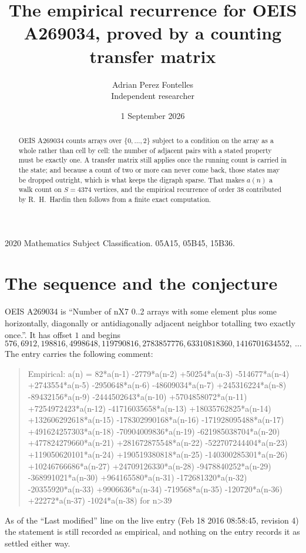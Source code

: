 \documentclass[11pt,a4paper]{article}
\title{The empirical recurrence for OEIS A269034, proved by a counting transfer matrix}
\author{Adrian Perez Fontelles\\ \small Independent researcher}
\date{1 September 2026}
\theoremstyle{plain}
\theoremstyle{definition}
\begin{document}
\maketitle

\begin{abstract}
OEIS A269034 counts arrays over $\{0,\dots,2\}$ subject to a condition on the array as a
whole rather than cell by cell: the number of adjacent pairs with a stated property must be
exactly one. A transfer matrix still applies once the running count is carried in the state; and
because a count of two or more can never come back, those states may be dropped outright,
which is what keeps the digraph sparse. That makes $a(n)$ a walk count on $S=4374$ vertices,
and the empirical recurrence of order $38$ contributed by R.~H.~Hardin then follows from
a finite exact computation.
\end{abstract}

\noindent\small 2020 Mathematics Subject Classification. 05A15, 05B45, 15B36.\normalsize

\section{The sequence and the conjecture}

OEIS A269034 is ``Number of nX7 0..2 arrays with some element plus some horizontally, diagonally or antidiagonally adjacent neighbor totalling two exactly once.''. It has offset $1$ and begins
\[
576, 6912, 198816, 4998648, 119790816, 2783857776, 63310818360, 1416701634552,\ \dots
\]
The entry carries the following comment:
\begin{quote}\small
Empirical: a(n) = 82*a(n-1) -2779*a(n-2) +50254*a(n-3) -514677*a(n-4) +2743554*a(n-5) -2950648*a(n-6) -48609034*a(n-7) +245316224*a(n-8) -89432156*a(n-9) -2444502643*a(n-10) +5704858072*a(n-11) +7254972423*a(n-12) -41716035658*a(n-13) +18035762825*a(n-14) +132606292618*a(n-15) -178302990168*a(n-16) -171928095488*a(n-17) +491624257303*a(n-18) -70904009836*a(n-19) -621985038704*a(n-20) +477824279660*a(n-21) +281672875548*a(n-22) -522707244404*a(n-23) +119050620101*a(n-24) +190519380818*a(n-25) -140300285301*a(n-26) +10246766686*a(n-27) +24709126330*a(n-28) -9478840252*a(n-29) -368991021*a(n-30) +964165580*a(n-31) -172681320*a(n-32) -20355920*a(n-33) +9906636*a(n-34) -719568*a(n-35) -120720*a(n-36) +22272*a(n-37) -1024*a(n-38) for n>39
\end{quote}
As of the ``Last modified'' line on the live entry (Feb 18 2016 08:58:45, revision 4) the statement is
still recorded as empirical, and nothing on the entry records it as settled either way.
\end{document}
